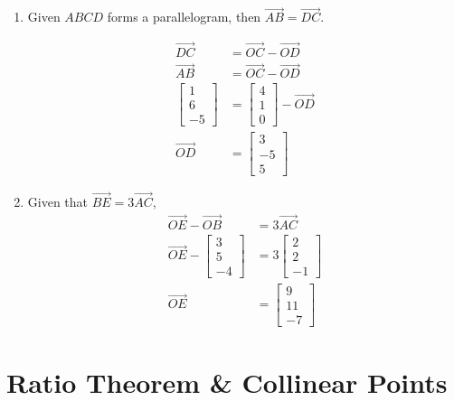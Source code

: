 \documentclass[11pt,a4paper]{book}
\begin{document}
\begin{example}
\begin{enumerate}[label=(\alph*)]
\item  Given $ABCD$ forms a parallelogram, then $\overrightarrow{AB}=\overrightarrow{DC}$.

\begin{align*}
\overrightarrow{DC} & =\overrightarrow{OC}-\overrightarrow{OD}\\
\overrightarrow{AB} & =\overrightarrow{OC}-\overrightarrow{OD}\\
\begin{bmatrix}1\\
6\\
-5
\end{bmatrix} & =\begin{bmatrix}4\\
1\\
0
\end{bmatrix}-\overrightarrow{OD}\\
\overrightarrow{OD} & =\begin{bmatrix}3\\
-5\\
5
\end{bmatrix}
\end{align*}

\item Given that $\overrightarrow{BE}=3\overrightarrow{AC}$,
\begin{align*}
\overrightarrow{OE}-\overrightarrow{OB} & =3\overrightarrow{AC}\\
\overrightarrow{OE}-\begin{bmatrix}3\\
5\\
-4
\end{bmatrix} & =3\begin{bmatrix}2\\
2\\
-1
\end{bmatrix}\\
\overrightarrow{OE} & =\begin{bmatrix}9\\
11\\
-7
\end{bmatrix}
\end{align*}

\end{enumerate}

\end{example}

\newpage

\section{Ratio Theorem \& Collinear Points}
\end{document}
